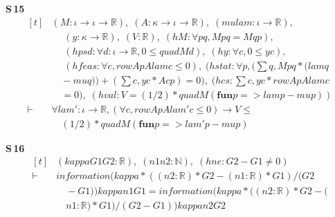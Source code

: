 \noindent\textbf{S\,15}\quad{}
{\footnotesize\[ \begin{aligned}[t]
&(\mathit{M} : \iota \to \iota \to \mathbb{R} ),\; (\mathit{A} : \kappa \to \iota \to \mathbb{R} ),\; (\mathit{mu} \mathit{lam} : \iota \to \mathbb{R} ),\\
&\quad \; (\mathit{y} : \kappa \to \mathbb{R} ),\; (\mathit{V} : \mathbb{R} ),\; (\mathit{hM} : \forall \mathit{p} \mathit{q}, \mathit{M} \mathit{p} \mathit{q} = \mathit{M} \mathit{q} \mathit{p}),\\
&\quad \; (\mathit{hpsd} : \forall \mathit{d} : \iota \to \mathbb{R} , 0 \leq \mathit{quad} \mathit{M} \mathit{d}),\; (\mathit{hy} : \forall \mathit{c}, 0 \leq \mathit{y} \mathit{c}),\\
&\quad \; (\mathit{hfeas} : \forall \mathit{c}, \mathit{rowAp} \mathit{A} \mathit{lam} \mathit{c} \leq 0),\; (\mathit{hstat} : \forall \mathit{p}, (\textstyle\sum \mathit{q}, \mathit{M} \mathit{p} \mathit{q} * (\mathit{lam} \mathit{q}\\
&\quad - \mathit{mu} \mathit{q})) + (\textstyle\sum \mathit{c}, \mathit{y} \mathit{c} * \mathit{A} \mathit{c} \mathit{p}) = 0),\; (\mathit{hcs} : \textstyle\sum \mathit{c}, \mathit{y} \mathit{c} * \mathit{rowAp} \mathit{A} \mathit{lam} \mathit{c}\\
&\quad = 0),\; (\mathit{hval} : \mathit{V} = (1/2) * \mathit{quad} \mathit{M} (\mathbf{fun} \mathit{p} => \mathit{lam} \mathit{p} - \mathit{mu} \mathit{p}))\\
\vdash\;&\forall \mathit{lam'} : \iota \to \mathbb{R} , (\forall \mathit{c}, \mathit{rowAp} \mathit{A} \mathit{lam'} \mathit{c} \leq 0) \to \mathit{V} \leq\\
&\quad (1/2) * \mathit{quad} \mathit{M} (\mathbf{fun} \mathit{p} => \mathit{lam'} \mathit{p} - \mathit{mu} \mathit{p})
\end{aligned} \]}

\noindent\textbf{S\,16}\quad{}
{\footnotesize\[ \begin{aligned}[t]
&(\mathit{kappa} \mathit{G1} \mathit{G2} : \mathbb{R} ),\; (\mathit{n1} \mathit{n2} : \mathbb{N} ),\; (\mathit{hne} : \mathit{G2} - \mathit{G1} \neq 0)\\
\vdash\;&\mathit{information} (\mathit{kappa} * ((\mathit{n2} : \mathbb{R} ) * \mathit{G2} - (\mathit{n1} : \mathbb{R} ) * \mathit{G1}) / (\mathit{G2}\\
&\quad - \mathit{G1})) \mathit{kappa} \mathit{n1} \mathit{G1} = \mathit{information} (\mathit{kappa} * ((\mathit{n2} : \mathbb{R} ) * \mathit{G2} - (\\
&\quad \mathit{n1} : \mathbb{R} ) * \mathit{G1}) / (\mathit{G2} - \mathit{G1})) \mathit{kappa} \mathit{n2} \mathit{G2}
\end{aligned} \]}

